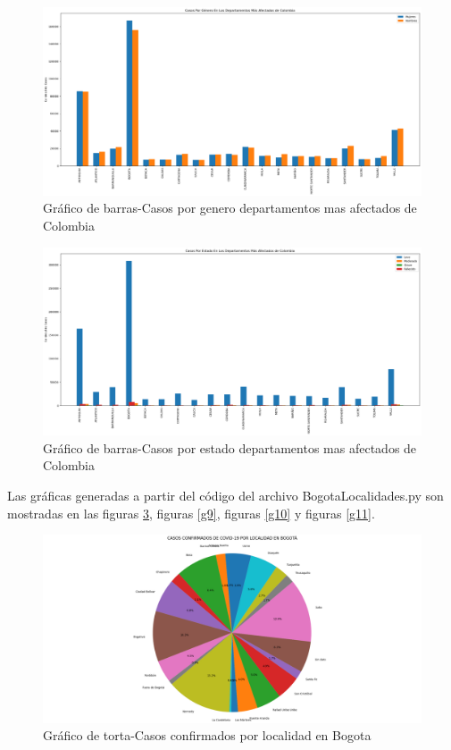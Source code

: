 \documentclass[conference,compsoc,onecolumn]{IEEEtran}
\begin{document}
\begin{figure}[H]
    \centering
    \includegraphics[scale=0.3]{PicturesUpdate/GraficaBarras_Genero_Covid_Departamento_Colombia_02-11-20.png}
    \caption{Gráfico de barras-Casos por genero departamentos mas afectados de Colombia}
    \label{g6}
\end{figure}

\begin{figure}[H]
    \centering
    \includegraphics[scale=0.3]{PicturesUpdate/GraficaBarras_Estado_Covid_Departamento_Colombia_02-11-20.png}
    \caption{Gráfico de barras-Casos por estado departamentos mas afectados de Colombia}
    \label{g7}
\end{figure}
\clearpage

Las gráficas generadas a partir del código del archivo BogotaLocalidades.py son mostradas en las figuras \ref{g8}, figuras \ref{g9}, figuras \ref{g10} y figuras \ref{g11}.

\begin{figure}[H]
    \centering
    \includegraphics[scale=0.3]{PicturesUpdate/GraficoCircular_Covid_Localidad_Bogota_02-11-20.png}
    \caption{Gráfico de torta-Casos confirmados por localidad en Bogota}
    \label{g8}
\end{figure}
\end{document}
